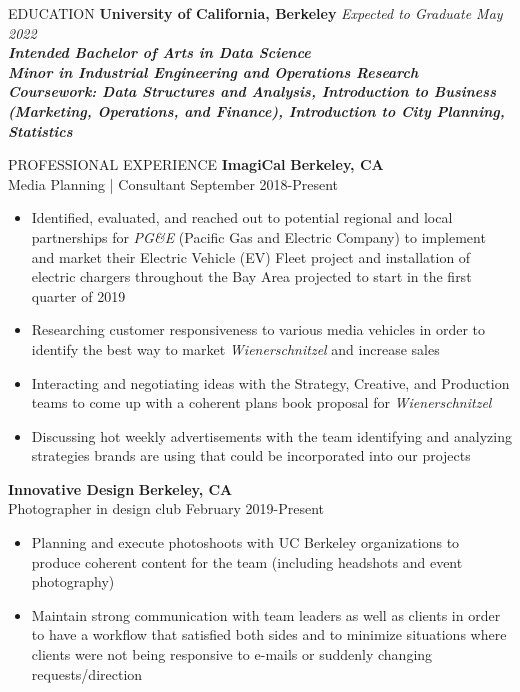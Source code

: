 \documentclass{resume}
\begin{document}

\begin{rSection}{EDUCATION}
\small
{\bf University of California, Berkeley } \hfill {\em Expected to Graduate May 2022} 
\\ \bf \em Intended Bachelor of Arts in Data Science
\\ \bf \em Minor in Industrial Engineering and Operations Research\\

{\em Coursework: Data Structures and Analysis, Introduction to Business (Marketing, Operations, and Finance), Introduction to City Planning, Statistics}


\end{rSection}


\begin{rSection}{PROFESSIONAL EXPERIENCE}
\small
{\bf ImagiCal } \hfill {\bf Berkeley, CA}
\\ {Media Planning | Consultant}  \hfill {September 2018-Present}
\begin{itemize}
  \item Identified, evaluated, and reached out to potential regional and local partnerships for {\em PG{\&}E} (Pacific Gas and Electric Company) to implement and market their Electric Vehicle (EV) Fleet project and installation of electric chargers throughout the Bay Area projected to start in the first quarter of 2019
  \item Researching customer responsiveness to various media vehicles in order to identify the best way to market {\em Wienerschnitzel} and increase sales
  \item Interacting and negotiating ideas with the Strategy, Creative, and Production teams to come up with a coherent plans book proposal for {\em Wienerschnitzel}
  \item Discussing hot weekly advertisements with the team identifying and analyzing strategies brands are using that could be incorporated into our projects 
\end{itemize}

{\bf Innovative Design } \hfill {\bf Berkeley, CA}
\\ {Photographer in design club	}  \hfill {February 2019-Present}
\begin{itemize}
  \item Planning and execute photoshoots with UC Berkeley organizations to produce coherent content for the team (including headshots and event photography)
  \item Maintain strong communication with team leaders as well as clients in order to have a workflow that satisfied both sides and to minimize situations where clients were not being responsive to e-mails or suddenly changing requests/direction
\end{itemize}


\end{rSection}
\end{document}
